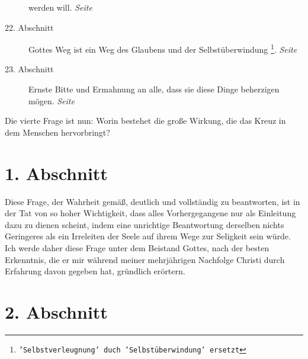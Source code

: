 \begin{description}
werden will.
\dotfill \textit{Seite~\pageref{kap4_ab21}}\\
\item[22. Abschnitt] Gottes Weg ist ein Weg des Glaubens und der
Selbstüberwindung \footnote{\texttt{'Selbstverleugnung' duch 'Selbstüberwindung'
ersetzt}}.
\dotfill \textit{Seite~\pageref{kap4_ab22}}\\
\item[23. Abschnitt] Ernste Bitte und Ermahnung an alle, dass sie diese Dinge
beherzigen mögen.
\dotfill \textit{Seite~\pageref{kap4_ab23}}\\
\end{description}

\newpage

Die vierte Frage ist nun: Worin bestehet die große Wirkung, die das Kreuz in dem
Menschen hervorbringt?


\section{1. Abschnitt} \label{kap4_ab1}

Diese Frage, der Wahrheit gemäß, deutlich und vollständig zu beantworten, ist in
der Tat von so hoher Wichtigkeit, dass alles Vorhergegangene nur als Einleitung
dazu zu dienen scheint, indem eine unrichtige Beantwortung derselben nichts
Geringeres als ein Irreleiten der Seele auf ihrem Wege zur Seligkeit sein würde.
Ich werde daher diese Frage unter dem Beistand Gottes, nach der besten
Erkenntnis, die er mir während meiner mehrjährigen Nachfolge Christi durch
Erfahrung davon gegeben hat, gründlich erörtern.

\section{2. Abschnitt} \label{kap4_ab2}

